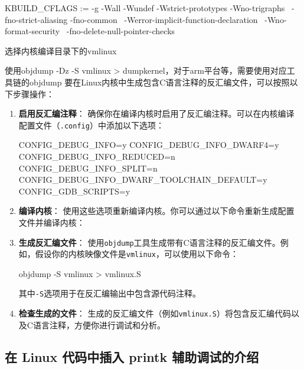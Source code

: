 \begin{CodeBlock}[language=BookMake]
KBUILD_CFLAGS := -g -Wall -Wundef -Wstrict-prototypes -Wno-trigraphs \
     -fno-strict-aliasing -fno-common \
     -Werror-implicit-function-declaration \
     -Wno-format-security \
     -fno-delete-null-pointer-checks
\end{CodeBlock}

选择内核编译目录下的vmlinux

使用objdump -Dz -S vmlinux \textgreater{} dumpkernel，对于arm平台等，需要使用对应工具链的objdump 要在Linux内核中生成包含C语言注释的反汇编文件，可以按照以下步骤操作：

\begin{enumerate}
\def\labelenumi{\arabic{enumi}.}
\item
  \textbf{启用反汇编注释}： 确保你在编译内核时启用了反汇编注释。可以在内核编译配置文件（\texttt{.config}）中添加以下选项：

\begin{CodeBlock}[language=BookConfig]
CONFIG_DEBUG_INFO=y
CONFIG_DEBUG_INFO_DWARF4=y
CONFIG_DEBUG_INFO_REDUCED=n
CONFIG_DEBUG_INFO_SPLIT=n
CONFIG_DEBUG_INFO_DWARF_TOOLCHAIN_DEFAULT=y
CONFIG_GDB_SCRIPTS=y
\end{CodeBlock}
\item
  \textbf{编译内核}： 使用这些选项重新编译内核。你可以通过以下命令重新生成配置文件并编译内核：

\begin{CodeBlock}[language=BookShell]
make menuconfig
make -j$(nproc)
\end{CodeBlock}
\item
  \textbf{生成反汇编文件}： 使用\texttt{objdump}工具生成带有C语言注释的反汇编文件。例如，假设你的内核映像文件是\texttt{vmlinux}，可以使用以下命令：

\begin{CodeBlock}[language=BookShell]
objdump -S vmlinux > vmlinux.S
\end{CodeBlock}

  其中\texttt{-S}选项用于在反汇编输出中包含源代码注释。
\item
  \textbf{检查生成的文件}： 生成的反汇编文件（例如\texttt{vmlinux.S}）将包含反汇编代码以及C语言注释，方便你进行调试和分析。
\end{enumerate}

\subsection{在 Linux 代码中插入 printk 辅助调试的介绍}\label{sec:02-software-preparation-020}

